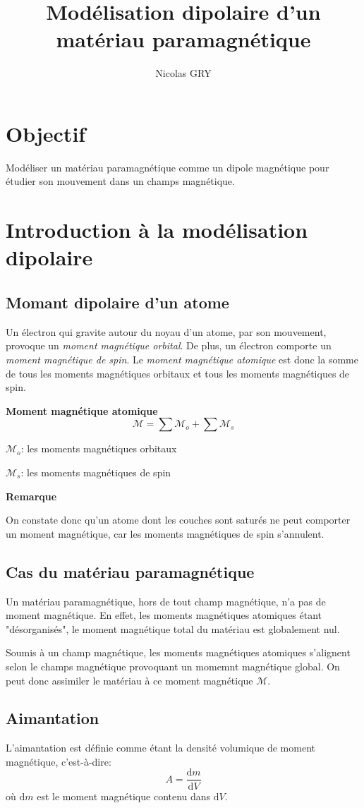 \documentclass{article}
\author{Nicolas GRY}
\title{Modélisation dipolaire d'un matériau paramagnétique}
\newcommand{\MM}{\mathcal{M}}
\begin{document}
\maketitle
\section{Objectif}
Modéliser un matériau paramagnétique comme un dipole magnétique pour étudier son mouvement dans un champs magnétique.

\section{Introduction à la modélisation dipolaire}
\subsection{Momant dipolaire d'un atome}
Un électron qui gravite autour du noyau d'un atome, par son mouvement, provoque un \emph{moment magnétique orbital}. De plus, un électron comporte un \emph{moment magnétique de spin}. Le \emph{moment magnétique atomique} est donc la somme de tous les moments magnétiques orbitaux et tous les moments magnétiques de spin.

\textbf{Moment magnétique atomique}
$$\MM = \displaystyle \sum \MM_{o} + \sum \MM_{s}$$

\small 
\textbf{$\MM_{o}$}: les moments magnétiques orbitaux

\textbf{$\MM_{s}$}: les moments magnétiques de spin
\normalsize

\textbf{Remarque}

On constate donc qu'un atome dont les couches sont saturés ne peut comporter un moment magnétique, car les moments magnétiques de spin s'annulent.

\subsection{Cas du matériau paramagnétique}
Un matériau paramagnétique, hors de tout champ magnétique, n'a pas de moment magnétique. En effet, les moments magnétiques atomiques étant "désorganisés", le moment magnétique total du matériau est globalement nul.

Soumis à un champ magnétique, les moments magnétiques atomiques s'alignent selon le champs magnétique provoquant un momemnt magnétique global. On peut donc assimiler le matériau à ce moment magnétique $\MM$.

\subsection{Aimantation}
L'aimantation est définie comme étant la densité volumique de moment magnétique, c'est-à-dire: $$A = \frac{\mathrm{d}m}{\mathrm{d}V}$$
où $\mathrm{d}m$ est le moment magnétique contenu dans $\mathrm{d}V$.
\end{document}
